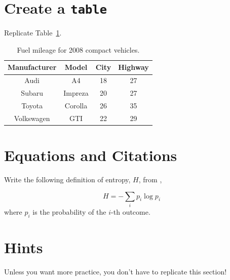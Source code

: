 \documentclass[twocolumn]{article}
\begin{document}
\section{Create a \texttt{table}} \label{sec:table}

Replicate Table~\ref{tab:mpg}.

\begin{table}[h]
    \centering
    \begin{tabular}{c|c|c|c}
        \textbf{Manufacturer} & \textbf{Model} & \textbf{City} & \textbf{Highway} \\ \hline
        Audi       & A4        & 18 & 27 \\ \hline
        Subaru     & Impreza   & 20 & 27 \\ \hline
        Toyota     & Corolla   & 26 & 35 \\ \hline
        Volkswagen & GTI       & 22 & 29 \\
    \end{tabular}
    \caption{Fuel mileage for 2008 compact vehicles.}
    \label{tab:mpg}
\end{table}

\section{Equations and Citations} \label{sec:eq_cite}

Write the following definition of entropy, $H$, from \cite{ref:shannon1948},

\begin{equation}
    H = -\sum_i p_i \log p_i
\end{equation}
where $p_i$ is the probability of the $i$-th outcome.




\section*{Hints}

Unless you want more practice, you don't have to replicate this section!
\end{document}
